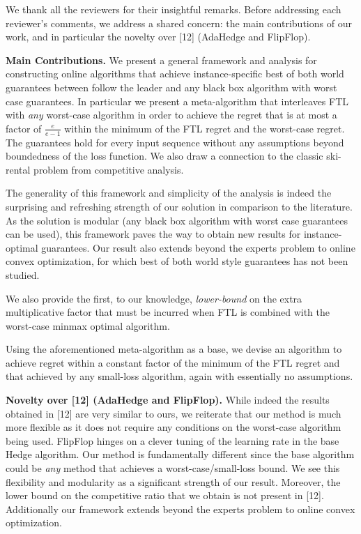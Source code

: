 \documentclass{article}
\begin{document}
We thank all the reviewers for their insightful remarks. Before addressing each reviewer's comments, we address a shared concern: the main contributions of our work, and in particular the novelty over [12] (AdaHedge and FlipFlop). 

{\bf Main Contributions.} We present a general framework and analysis for constructing online algorithms that achieve instance-specific best of both world guarantees between follow the leader and any black box algorithm with worst case guarantees. In particular we present a meta-algorithm that interleaves FTL with \emph{any} worst-case algorithm in order to achieve the regret that is at most a factor of $\frac{e}{e-1}$ within the minimum of the FTL regret and the worst-case regret. The guarantees hold for every input sequence without any assumptions beyond boundedness of the loss function. We also draw a connection to the classic ski-rental problem from competitive analysis. 

The generality of this framework and simplicity of the analysis is indeed the surprising and refreshing strength of our solution in comparison to the literature. As the solution is modular (any black box algorithm with worst case guarantees can be used), this framework paves the way to obtain new results for instance-optimal guarantees. Our result also extends beyond the experts problem to online convex optimization, for which best of both world style guarantees has not been studied. 

We also provide the first, to our knowledge, \emph{lower-bound} on the extra multiplicative factor that must be incurred when FTL is combined with the worst-case minmax optimal algorithm. 

Using the aforementioned meta-algorithm as a base, we devise an algorithm to achieve regret within a constant factor of the minimum of the FTL regret and that achieved by any small-loss algorithm, again with essentially no assumptions. 

{\bf Novelty over [12] (AdaHedge and FlipFlop).} While indeed the results obtained in [12] are very similar to ours, we reiterate that our method is much more flexible as it does not require any conditions on the worst-case algorithm being used. FlipFlop hinges on a clever tuning of the learning rate in the base Hedge algorithm. Our method is fundamentally different since the base algorithm could be \emph{any} method that achieves a worst-case/small-loss bound. We see this flexibility and modularity as a significant strength of our result.  Moreover, the lower bound on the competitive ratio that we obtain is not present in [12]. Additionally our framework extends beyond the experts problem to online convex optimization.
\end{document}
